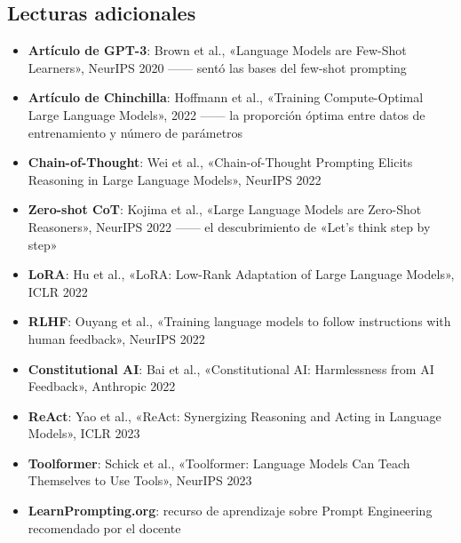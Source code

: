 \documentclass[a4paper]{article}
\begin{document}
\subsection{Lecturas adicionales}

\begin{itemize}
    \item \textbf{Artículo de GPT-3}: Brown et al., «Language Models are Few-Shot Learners», NeurIPS 2020 —— sentó las bases del few-shot prompting
    \item \textbf{Artículo de Chinchilla}: Hoffmann et al., «Training Compute-Optimal Large Language Models», 2022 —— la proporción óptima entre datos de entrenamiento y número de parámetros
    \item \textbf{Chain-of-Thought}: Wei et al., «Chain-of-Thought Prompting Elicits Reasoning in Large Language Models», NeurIPS 2022
    \item \textbf{Zero-shot CoT}: Kojima et al., «Large Language Models are Zero-Shot Reasoners», NeurIPS 2022 —— el descubrimiento de «Let's think step by step»
    \item \textbf{LoRA}: Hu et al., «LoRA: Low-Rank Adaptation of Large Language Models», ICLR 2022
    \item \textbf{RLHF}: Ouyang et al., «Training language models to follow instructions with human feedback», NeurIPS 2022
    \item \textbf{Constitutional AI}: Bai et al., «Constitutional AI: Harmlessness from AI Feedback», Anthropic 2022
    \item \textbf{ReAct}: Yao et al., «ReAct: Synergizing Reasoning and Acting in Language Models», ICLR 2023
    \item \textbf{Toolformer}: Schick et al., «Toolformer: Language Models Can Teach Themselves to Use Tools», NeurIPS 2023
    \item \textbf{LearnPrompting.org}: recurso de aprendizaje sobre Prompt Engineering recomendado por el docente
\end{itemize}

\end{document}
